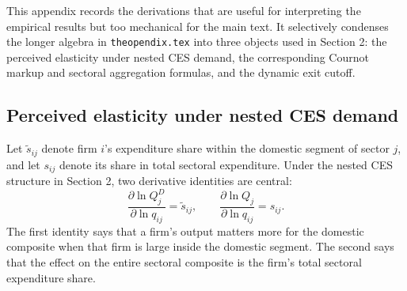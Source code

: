 This appendix records the derivations that are useful for interpreting the empirical results but too mechanical for the main text. It selectively condenses the longer algebra in \texttt{theopendix.tex} into three objects used in Section 2: the perceived elasticity under nested CES demand, the corresponding Cournot markup and sectoral aggregation formulas, and the dynamic exit cutoff.

\subsection{Perceived elasticity under nested CES demand}

Let $\tilde{s}_{ij}$ denote firm $i$'s expenditure share within the domestic segment of sector $j$, and let $s_{ij}$ denote its share in total sectoral expenditure. Under the nested CES structure in Section 2, two derivative identities are central:
\begin{equation}
\frac{\partial \ln Q_j^D}{\partial \ln q_{ij}} = \tilde{s}_{ij},
\qquad
\frac{\partial \ln Q_j}{\partial \ln q_{ij}} = s_{ij}.
\label{eq:appsel_quantity_links}
\end{equation}
The first identity says that a firm's output matters more for the domestic composite when that firm is large inside the domestic segment. The second says that the effect on the entire sectoral composite is the firm's total sectoral expenditure share.

